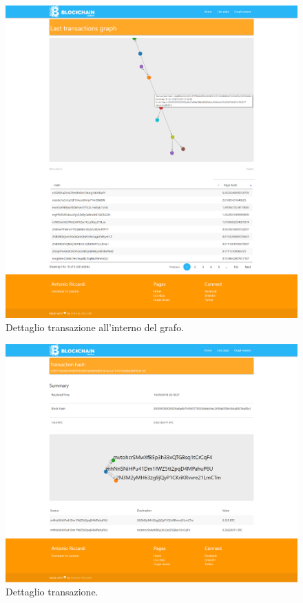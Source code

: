 \begin{figure}[H]
	\centering
	\includegraphics[width=\textwidth, height=0.80\textheight]{images/lastGraph-2.jpg}
	\caption{Dettaglio transazione all'interno del grafo.}
	\label{fig:graph2BE}
\end{figure}

\begin{figure}[H]
	\centering
	\includegraphics[width=\textwidth, height=0.80\textheight]{images/infoTransaction2.png}
	\caption{Dettaglio transazione.}
	\label{fig:detailBE}
\end{figure}

